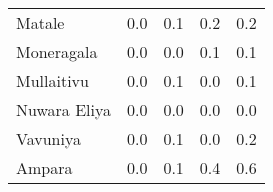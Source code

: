 \begin{tabular}{lrrrr}
Matale       &            0.0 &                 0.1 &            0.2 &                 0.2 \\
Moneragala   &            0.0 &                 0.0 &            0.1 &                 0.1 \\
Mullaitivu   &            0.0 &                 0.1 &            0.0 &                 0.1 \\
Nuwara Eliya &            0.0 &                 0.0 &            0.0 &                 0.0 \\
Vavuniya     &            0.0 &                 0.1 &            0.0 &                 0.2 \\
Ampara       &            0.0 &                 0.1 &            0.4 &                 0.6 \\
\bottomrule
\end{tabular}
